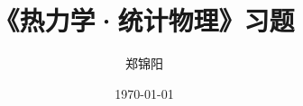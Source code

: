 \documentclass{ctexart}
\begin{document}
\title{《热力学·统计物理》习题}
\author{郑锦阳}
\date{\today}
\maketitle
\tableofcontents



\end{document}
